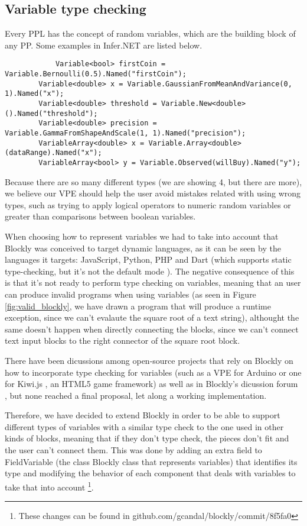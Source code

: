 \subsection{Variable type checking}

Every PPL has the concept of random variables, which are the building block of
any PP. Some examples in Infer.NET are listed below.

\begin{lstlisting}
  			Variable<bool> firstCoin = Variable.Bernoulli(0.5).Named("firstCoin");
        Variable<double> x = Variable.GaussianFromMeanAndVariance(0, 1).Named("x");
        Variable<double> threshold = Variable.New<double>().Named("threshold");
        Variable<double> precision = Variable.GammaFromShapeAndScale(1, 1).Named("precision");
        VariableArray<double> x = Variable.Array<double>(dataRange).Named("x");
        VariableArray<bool> y = Variable.Observed(willBuy).Named("y");
\end{lstlisting}

Because there are so many different types (we are showing 4, but there are more),
we believe our VPE should help the user avoid mistakes related with using wrong
types, such as trying to apply logical operators to numeric random variables or
greater than comparisons between boolean variables.

When choosing how to represent variables we had to take into account that
Blockly was conceived to target dynamic languages, as it can be seen by the languages
it targets: JavaScript, Python, PHP and Dart (which supports static type-checking,
but it's not the default mode \cite{dart}). The negative consequence of this is that it's
not ready to perform type checking on variables, meaning that an user can
produce invalid programs when using variables (as seen in Figure \ref{fig:valid_blockly}, we have
drawn a program that will produce a runtime exception, since we can't evalaute
the square root of a text string), althought the same doesn't happen when
directly connecting the blocks, since we can't connect text input blocks to the
right connector of the square root block.

There have been dicussions among open-source projects that rely on Blockly on how
to incorporate type checking for variables (such as a VPE for Arduino \cite{bduino}
or one for Kiwi.js \cite{gbl}, an HTML5 game framework) as well as in Blockly's
dicussion forum \cite{gbl2}, but none reached a final proposal, let along a working
implementation.

Therefore, we have decided to extend Blockly in order to be able to support
different types of variables with a similar type check to the one used in other
kinds of blocks, meaning that if they don't type check, the pieces don't fit and the user
can't connect them. This was done by adding an extra field to FieldVariable
(the class Blockly class that represents variables) that identifies its type and
modifying the behavior of each component that deals with variables to take that
into account \footnote{These changes can be found in github.com/gcandal/blockly/commit/8f5fa0}.

